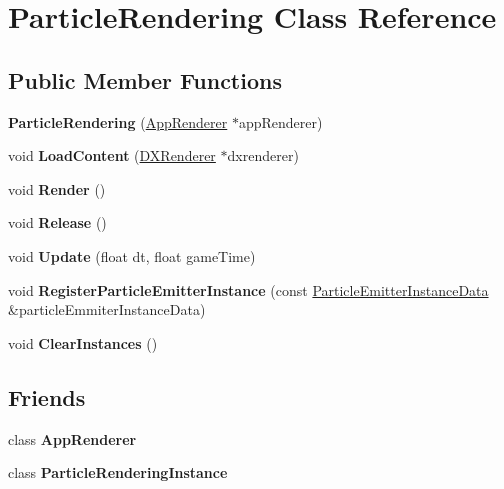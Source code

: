 \hypertarget{classParticleRendering}{}\section{Particle\+Rendering Class Reference}
\label{classParticleRendering}
\subsection*{Public Member Functions}
\begin{DoxyCompactItemize}
\item 
\mbox{\label{classParticleRendering_a220b3b49f3a4eeef7e4bd711626651d7}} 
{\bfseries Particle\+Rendering} (\hyperlink{classAppRenderer}{App\+Renderer} $\ast$app\+Renderer)
\item 
\mbox{\label{classParticleRendering_a38e0d5b06ee499c355b592c071527a7e}} 
void {\bfseries Load\+Content} (\hyperlink{classDXRenderer}{D\+X\+Renderer} $\ast$dxrenderer)
\item 
\mbox{\label{classParticleRendering_adcec4227f9e8223a70fc513dba6eb434}} 
void {\bfseries Render} ()
\item 
\mbox{\label{classParticleRendering_ad87f18215d9de1a288b15f96203582c1}} 
void {\bfseries Release} ()
\item 
\mbox{\label{classParticleRendering_aa7c1d5b5f3fb05f54cb9d4ff24c7caf0}} 
void {\bfseries Update} (float dt, float game\+Time)
\item 
\mbox{\label{classParticleRendering_a766307f91238afe4da6af25b858f472b}} 
void {\bfseries Register\+Particle\+Emitter\+Instance} (const \hyperlink{structParticleEmitterInstanceData}{Particle\+Emitter\+Instance\+Data} \&particle\+Emmiter\+Instance\+Data)
\item 
\mbox{\label{classParticleRendering_a9a3893e69f75dd572537b9d2486ebf37}} 
void {\bfseries Clear\+Instances} ()
\end{DoxyCompactItemize}
\subsection*{Friends}
\begin{DoxyCompactItemize}
\item 
\mbox{\label{classParticleRendering_a5f3d064e51c4a3bf9409801632b9a7af}} 
class {\bfseries App\+Renderer}
\item 
\mbox{\label{classParticleRendering_aba9f3240241811e775ef4280a9df4333}} 
class {\bfseries Particle\+Rendering\+Instance}
\end{DoxyCompactItemize}


